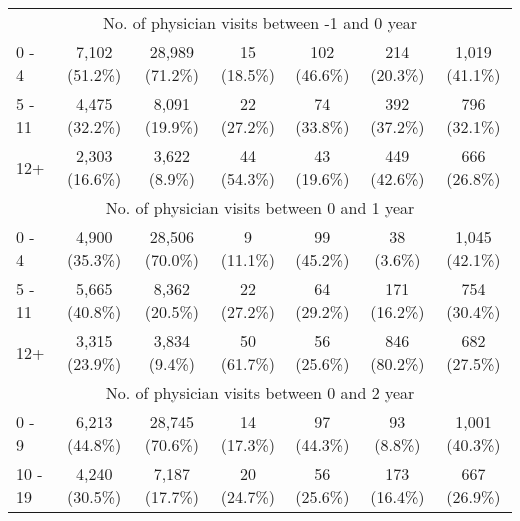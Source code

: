\documentclass{article}
\begin{document}
\begin{table}[htbp]
\begin{longtable}{l*{6}{c}}
\multicolumn{7}{c}{No. of physician visits between -1 and 0 year           }\\
  0 - 4                                                 &          7,102 (51.2\%)         &         28,989 (71.2\%)         &           15 (18.5\%)           &           102 (46.6\%)          &           214 (20.3\%)          &          1,019 (41.1\%)         \\
  5 - 11                                                &          4,475 (32.2\%)         &          8,091 (19.9\%)         &           22 (27.2\%)           &           74 (33.8\%)           &           392 (37.2\%)          &           796 (32.1\%)          \\
  12+                                                   &          2,303 (16.6\%)         &          3,622 (8.9\%)          &           44 (54.3\%)           &           43 (19.6\%)           &           449 (42.6\%)          &           666 (26.8\%)          \\
\multicolumn{7}{c}{No. of physician visits between 0 and 1 year            }\\
  0 - 4                                                 &          4,900 (35.3\%)         &         28,506 (70.0\%)         &            9 (11.1\%)           &           99 (45.2\%)           &            38 (3.6\%)           &          1,045 (42.1\%)         \\
  5 - 11                                                &          5,665 (40.8\%)         &          8,362 (20.5\%)         &           22 (27.2\%)           &           64 (29.2\%)           &           171 (16.2\%)          &           754 (30.4\%)          \\
  12+                                                   &          3,315 (23.9\%)         &          3,834 (9.4\%)          &           50 (61.7\%)           &           56 (25.6\%)           &           846 (80.2\%)          &           682 (27.5\%)          \\
\multicolumn{7}{c}{No. of physician visits between 0 and 2 year            }\\
  0 - 9                                                 &          6,213 (44.8\%)         &         28,745 (70.6\%)         &           14 (17.3\%)           &           97 (44.3\%)           &            93 (8.8\%)           &          1,001 (40.3\%)         \\
  10 - 19                                               &          4,240 (30.5\%)         &          7,187 (17.7\%)         &           20 (24.7\%)           &           56 (25.6\%)           &           173 (16.4\%)          &           667 (26.9\%)          \\

\end{longtable}
\end{table}
\end{document}
